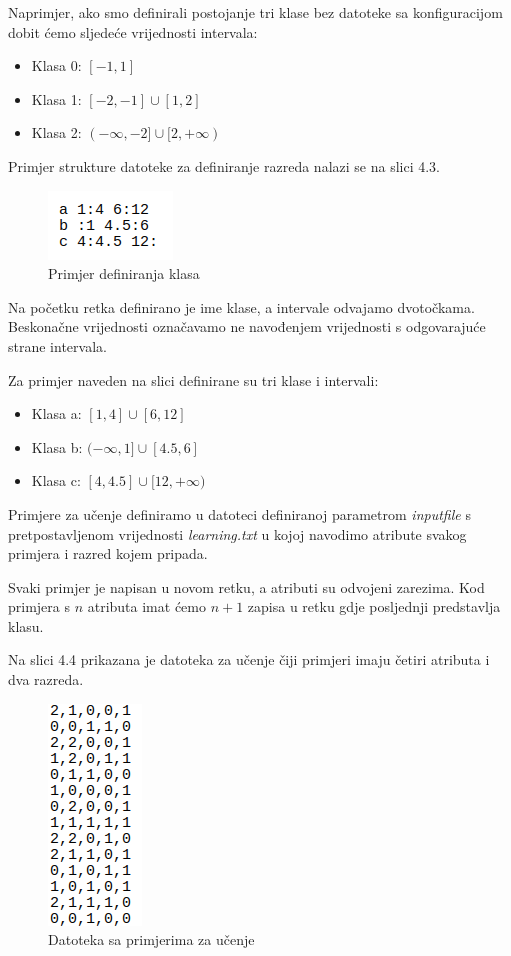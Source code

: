 \documentclass[times, utf8, zavrsni]{fer}
\begin{document}
Naprimjer, ako smo definirali postojanje tri klase bez datoteke sa konfiguracijom dobit ćemo sljedeće vrijednosti intervala:

\begin{itemize}
\item Klasa 0: $[-1,  1]$
\item Klasa 1: $[-2, -1] \cup [1, 2]$
\item Klasa 2: $(-\infty, -2] \cup [2, +\infty)$

\end{itemize}

Primjer strukture datoteke za definiranje razreda nalazi se na slici 4.3.

\begin{figure}[htb]
\centering
\includegraphics[scale=0.6]{images/klase}
\caption{Primjer definiranja klasa}
\end{figure}

Na početku retka definirano je ime klase, a intervale odvajamo dvotočkama.
Beskonačne vrijednosti označavamo ne navođenjem vrijednosti s odgovarajuće strane intervala.

Za primjer naveden na slici definirane su tri klase i intervali:

\begin{itemize}
\item Klasa a: $[1,4] \cup [6,12]$
\item Klasa b: $(-\infty, 1] \cup [4.5,6]$
\item Klasa c: $[4, 4.5] \cup [12, +\infty)$
\end{itemize}


Primjere za učenje definiramo u datoteci definiranoj parametrom \textit{inputfile} s pretpostavljenom vrijednosti \textit{learning.txt} u kojoj navodimo atribute svakog primjera i razred kojem pripada.

Svaki primjer je napisan u novom retku, a atributi su odvojeni zarezima. Kod primjera s $n$ atributa imat ćemo $n+1$ zapisa u retku gdje posljednji predstavlja klasu.

Na slici 4.4 prikazana je datoteka za učenje čiji primjeri imaju četiri atributa i dva razreda.


\begin{figure}[htb]
\centering
\includegraphics[scale=0.5]{images/learning}
\caption{Datoteka sa primjerima za učenje}
\end{figure}
\end{document}
